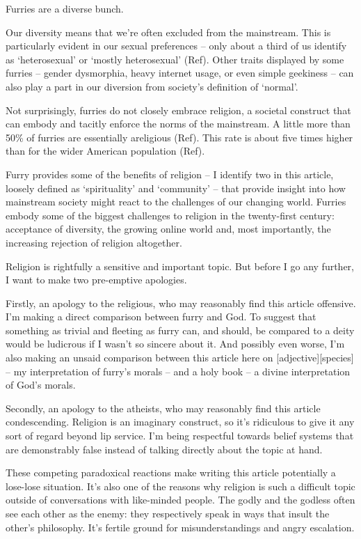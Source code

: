 
Furries are a diverse bunch.

Our diversity means that we're often excluded from the mainstream. This is particularly evident in our sexual preferences -- only about a third of us identify as `heterosexual' or `mostly heterosexual' (Ref). Other traits displayed by some furries -- gender dysmorphia, heavy internet usage, or even simple geekiness -- can also play a part in our diversion from society's definition of `normal'.

Not surprisingly, furries do not closely embrace religion, a societal construct that can embody and tacitly enforce the norms of the mainstream. A little more than 50\% of furries are essentially areligious (Ref). This rate is about five times higher than for the wider American population (Ref).

Furry provides some of the benefits of religion -- I identify two in this article, loosely defined as `spirituality' and `community' -- that provide insight into how mainstream society might react to the challenges of our changing world. Furries embody some of the biggest challenges to religion in the twenty-first century: acceptance of diversity, the growing online world and, most importantly, the increasing rejection of religion altogether.

Religion is rightfully a sensitive and important topic. But before I go any further, I want to make two pre-emptive apologies.

Firstly, an apology to the religious, who may reasonably find this article offensive. I'm making a direct comparison between furry and God. To suggest that something as trivial and fleeting as furry can, and should, be compared to a deity would be ludicrous if I wasn't so sincere about it. And possibly even worse, I'm also making an unsaid comparison between this article here on [adjective][species] -- my interpretation of furry's morals -- and a holy book -- a divine interpretation of God's morals.

Secondly, an apology to the atheists, who may reasonably find this article condescending. Religion is an imaginary construct, so it's ridiculous to give it any sort of regard beyond lip service. I'm being respectful towards belief systems that are demonstrably false instead of talking directly about the topic at hand.

These competing paradoxical reactions make writing this article potentially a lose-lose situation. It's also one of the reasons why religion is such a difficult topic outside of conversations with like-minded people. The godly and the godless often see each other as the enemy: they respectively speak in ways that insult the other's philosophy. It's fertile ground for misunderstandings and angry escalation.

